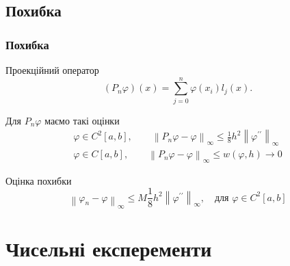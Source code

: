 \documentclass{beamer}
\numberwithin{equation}{section}
\begin{document}
	
	\subsection{Похибка}	
	\begin{frame}
		\frametitle{Похибка}
	
		\begin{block}{Проекційний оператор }
		$$
		\left(P_{n} \varphi\right)(x)= \sum_{j=0}^{n} \varphi\left(x_{i}\right) l_{j}(x) .
		$$
		\end{block}
		
		Для $P_{n} \varphi$ маємо такі оцінки 
		$$
		\begin{array}{l}
			\displaystyle
			\varphi \in C^{2}[a, b], \quad \quad \left\|P_{n} \varphi-\varphi\right\|_{\infty} \leq \frac{1}{8} h^{2}\left\|\varphi^{\prime \prime}\right\|_{\infty}  
			\\[0.3cm]
			
			\displaystyle
			\varphi \in C[a, b], \quad \quad \left\|P_{n} \varphi-\varphi\right\|_{\infty} \leq w(\varphi, h) \rightarrow 0
		\end{array}
		$$
		
	
	\begin{block}{Оцінка похибки}
		$$
		\left\|\varphi_{n}-\varphi\right\|_{\infty} \leq M \frac{1}{8} h^{2}\left\|\varphi^{\prime \prime}\right\|_{\infty}, \quad \text{для } 
		\varphi \in C^{2}[a, b]
		$$
	\end{block}	
			
		
		
	\end{frame}
	

	\section{Чисельні експеременти} 
\end{document}
